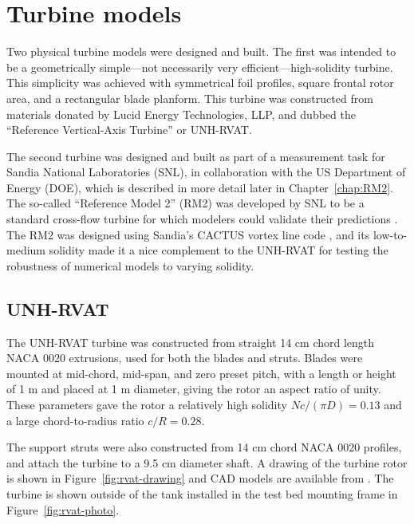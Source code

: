 

\section{Turbine models}

Two physical turbine models were designed and built. The first was intended to
be a geometrically simple---not necessarily very efficient---high-solidity
turbine. This simplicity was achieved with symmetrical foil profiles, square
frontal rotor area, and a rectangular blade planform. This turbine was
constructed from materials donated by Lucid Energy Technologies, LLP, and dubbed
the ``Reference Vertical-Axis Turbine'' or UNH-RVAT.

The second turbine was designed and built as part of a measurement task for
Sandia National Laboratories (SNL), in collaboration with the US Department of
Energy (DOE), which is described in more detail later in Chapter~\ref{chap:RM2}.
The so-called ``Reference Model 2'' (RM2) was developed by SNL to be a standard
cross-flow turbine for which modelers could validate their predictions
\cite{Neary2014}. The RM2 was designed using Sandia's CACTUS vortex line code
\cite{Barone2011}, and its low-to-medium solidity made it a nice complement to
the UNH-RVAT for testing the robustness of numerical models to varying solidity.


\subsection{UNH-RVAT}

The UNH-RVAT turbine was constructed from straight 14 cm chord length NACA 0020
extrusions, used for both the blades and struts. Blades were mounted at
mid-chord, mid-span, and zero preset pitch, with a length or height of 1 m and
placed at 1 m diameter, giving the rotor an aspect ratio of unity. These
parameters gave the rotor a relatively high solidity $Nc/(\pi D) = 0.13$ and a
large chord-to-radius ratio $c/R = 0.28$.

The support struts were also constructed from 14 cm chord NACA 0020 profiles,
and attach the turbine to a 9.5 cm diameter shaft. A drawing of the turbine
rotor is shown in Figure~\ref{fig:rvat-drawing} and CAD models are available
from \cite{Bachant2014-RVAT-CAD}. The turbine is shown outside of the tank
installed in the test bed mounting frame in Figure~\ref{fig:rvat-photo}.


